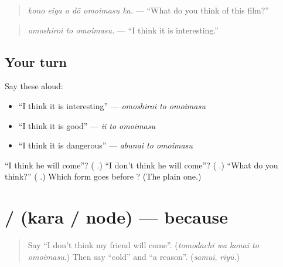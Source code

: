 \begin{quote}
\emph{kono eiga o dō omoimasu ka.} — \textquotedblleft{}What do you think of this film?\textquotedblright{}
\end{quote}

\begin{quote}
\textbf{ }
\end{quote}

\begin{quote}
\emph{omoshiroi to omoimasu.} — \textquotedblleft{}I think it is interesting.\textquotedblright{}
\end{quote}

\subsection*{Your turn}
Say these aloud:

\begin{itemize}
\raggedright
  \item \textquotedblleft{}I think it is interesting\textquotedblright{} — \emph{omoshiroi to omoimasu}
  \item \textquotedblleft{}I think it is good\textquotedblright{} — \emph{ii to omoimasu}
  \item \textquotedblleft{}I think it is dangerous\textquotedblright{} — \emph{abunai to omoimasu}
\end{itemize}

\begin{tcolorbox}[breakable,colback=teal!4,colframe=teal!35!black,title={Before you move on}]
\textquotedblleft{}I think he will come\textquotedblright{}? (\textbf{ }.) \textquotedblleft{}I don't think he will come\textquotedblright{}? (\textbf{ }.) \textquotedblleft{}What do you think?\textquotedblright{} (\textbf{ }.) Which form goes before \textbf{}? (The plain one.)
\end{tcolorbox}
\section[\texorpdfstring{\ja{から} / \ja{ので} (kara / node)}{から / ので (kara / node)}]{ /  (kara / node) — because}

\label{lesson:JA-C254-kara-node}



\begin{quote}
Say \textquotedblleft{}I don't think my friend will come\textquotedblright{}. (\emph{tomodachi wa konai to omoimasu}.) Then say \textquotedblleft{}cold\textquotedblright{} and \textquotedblleft{}a reason\textquotedblright{}. (\emph{samui}, \emph{riyū}.)
\end{quote}


